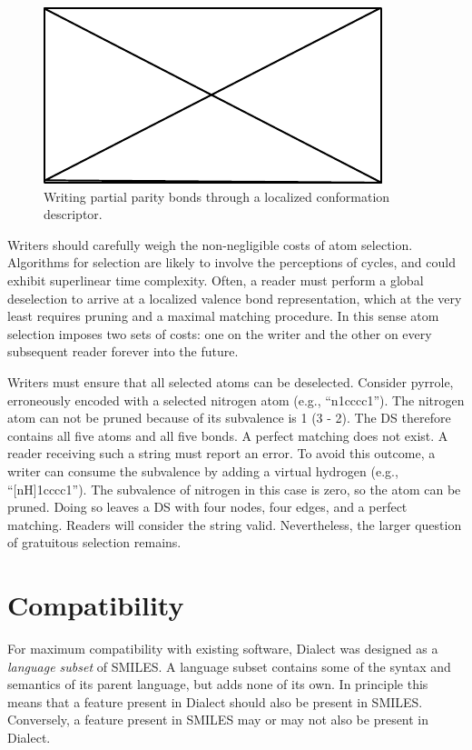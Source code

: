 \documentclass{article}
\begin{document}
\begin{figure}
    \centering
    \includegraphics{filler}
    \caption{Writing partial parity bonds through a localized conformation descriptor.}
    \label{fig:writing-ppb}
\end{figure}

Writers should carefully weigh the non-negligible costs of atom selection. Algorithms for selection are likely to involve the perceptions of cycles, and could exhibit superlinear time complexity. Often, a reader must perform a global deselection to arrive at a localized valence bond representation, which at the very least requires pruning and a maximal matching procedure. In this sense atom selection imposes two sets of costs: one on the writer and the other on every subsequent reader forever into the future.

Writers must ensure that all selected atoms can be deselected. Consider pyrrole, erroneously encoded with a selected nitrogen atom (e.g., \enquote{n1cccc1}). The nitrogen atom can not be pruned because of its subvalence is 1 (3 - 2). The DS therefore contains all five atoms and all five bonds. A perfect matching does not exist. A reader receiving such a string must report an error. To avoid this outcome, a writer can consume the subvalence by adding a virtual hydrogen (e.g., \enquote{[nH]1cccc1}). The subvalence of nitrogen in this case is zero, so the atom can be pruned. Doing so leaves a DS with four nodes, four edges, and a perfect matching. Readers will consider the string valid. Nevertheless, the larger question of gratuitous selection remains.

\section*{Compatibility}

For maximum compatibility with existing software, Dialect was designed as a \textit{language subset} of SMILES. A language subset contains some of the syntax and semantics of its parent language, but adds none of its own. In principle this means that a feature present in Dialect should also be present in SMILES. Conversely, a feature present in SMILES may or may not also be present in Dialect.
\end{document}
